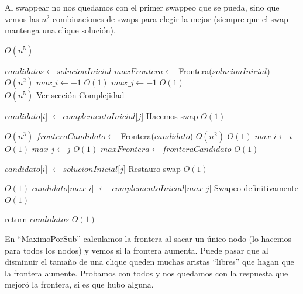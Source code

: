 Al swappear no nos quedamos con el primer swappeo que se pueda, sino que vemos las $n^2$ combinaciones de swaps para elegir la mejor (siempre que el swap mantenga una clique solución).

\begin{algorithm}[H]
\begin{algorithmic}
   \Comment $O(n^5)$

    \State $candidatos \gets solucionInicial$
    \State $maxFrontera \gets$ Frontera($solucionInicial$)  \Comment $O(n^2)$
    \State $max\_i \gets -1$                                \Comment $O(1)$
    \State $max\_j \gets -1$                                \Comment $O(1)$\\

    \For{$i \in [0..|solucionInicial|)$}                    \Comment $O(n^5)$ Ver sección Complejidad
        \For{$j \in [0..|complementoInicial|)$}

            \State $candidato$[$i$] $\gets complementoInicial$[$j$] \Comment Hacemos swap $O(1)$

                                                     \Comment $O(n^3)$
                \State $fronteraCandidato \gets$ Frontera($candidato$)          \Comment $O(n^2)$
                                          \Comment $O(1)$
                    \State $max\_i \gets i$                                     \Comment $O(1)$
                    \State $max\_j \gets j$                                     \Comment $O(1)$
                    \State $maxFrontera \gets fronteraCandidato$                \Comment $O(1)$
                \EndIf
            \EndIf

            \State $candidato$[$i$] $\gets solucionInicial$[$j$] \Comment Restauro swap $O(1)$
        \EndFor
    \EndFor

                               \Comment $O(1)$
        \State $candidato$[$max\_i$] $\gets$ $complementoInicial$[$max\_j$] \Comment Swapeo definitivamente $O(1)$
    \EndIf

    \State return $candidatos$                      \Comment $O(1)$

\EndFunction
\end{algorithmic}
\end{algorithm}

En ``MaximoPorSub'' calculamos la frontera al sacar un único nodo (lo hacemos para todos los nodos) y vemos si la frontera aumenta. Puede pasar que al disminuir el tamaño de una clique queden muchas aristas ``libres'' que hagan que la frontera aumente. Probamos con todos y nos quedamos con la respuesta que mejoró la frontera, si es que hubo alguna.

